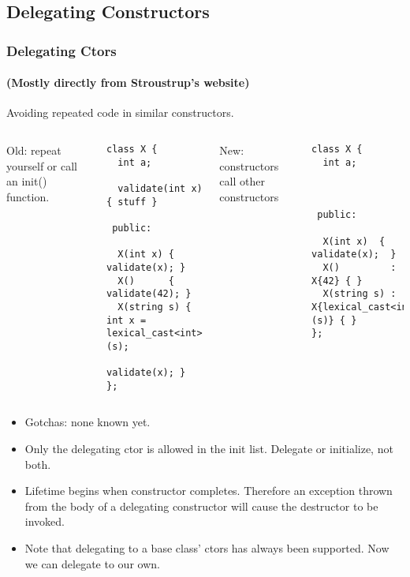 
\subsection{Delegating Constructors}
\lyxframeend{}


\begin{frame}[fragile]
\frametitle{Delegating Ctors}
\framesubtitle{(Mostly directly from Stroustrup's website)}
Avoiding repeated code in similar constructors.
\begin{columns}[t]
{\scriptsize
Old: repeat yourself or call an init() function.
\begin{verbatim}
class X {
  int a;

  validate(int x) { stuff }

 public:

  X(int x) { validate(x); }
  X()      { validate(42); }
  X(string s) { int x = lexical_cast<int>(s);
                validate(x); }
};
\end{verbatim}
}
\pause{}
{\scriptsize
New: constructors call other constructors

\begin{verbatim}
class X {
  int a;



 public:

  X(int x)  { validate(x);  }
  X()         : X{42} { }
  X(string s) : X{lexical_cast<int>(s)} { }
};
\end{verbatim}
}
\end{columns}

\pause{}

\begin{itemize}
\item Gotchas: none known yet.
\item Only the delegating ctor is allowed in the init list.  Delegate
  or initialize, not both.
\item Lifetime begins when  constructor completes.
  Therefore an exception thrown from the body of a
  delegating constructor will cause the destructor to be invoked.

\item Note that delegating to a base class' ctors has always been
supported.  Now we can delegate to our own.

\end{itemize}
\end{frame}

